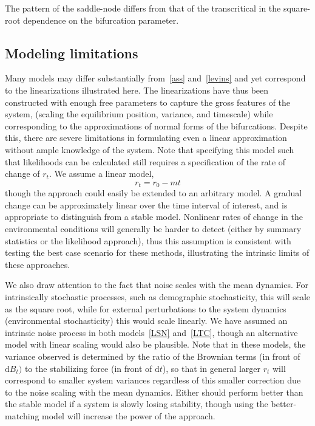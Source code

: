 \documentclass[authoryear, preprint,review,12pt]{elsarticle}
\newcommand{\ud}{\mathrm{d}}
\begin{document}
The pattern of the saddle-node differs from that of the transcritical in the square-root dependence on the bifurcation parameter.


\subsection{Modeling limitations}
Many models may differ substantially from~\eqref{ass} and~\eqref{levins} and yet correspond to the linearizations illustrated here.  
The linearizations have thus been constructed with enough free parameters to capture the gross features of the system,
(scaling the equilibrium position, variance, and timescale) while corresponding to the approximations of normal forms of the bifurcations.  
Despite this, there are severe limitations in formulating even a linear approximation without ample knowledge of the system. 
Note that specifying this model such that likelihoods can be calculated still requires a specification of the rate of change of $r_t$.
We assume a linear model,
\begin{equation}
r_t = r_0 - m t
\label{R_t}
\end{equation}
though the approach could easily be extended to an arbitrary model.
A gradual change can be approximately linear over the time interval of interest, and is appropriate to distinguish from a stable model.
Nonlinear rates of change in the environmental conditions will generally be harder to detect (either by summary statistics or the likelihood approach),
thus this assumption is consistent with testing the best case scenario for these methods, illustrating the intrinsic limits of these approaches.  

We also draw attention to the fact that noise scales with the mean dynamics.  
For intrinsically stochastic processes, such as demographic stochasticity, this will scale as the square root, 
while for external perturbations to the system dynamics (environmental stochasticity) this would scale linearly.
We have assumed an intrinsic noise process in both models~\eqref{LSN} and~\eqref{LTC}, 
though an alternative model with linear scaling would also be plausible.  
Note that in these models, the variance observed is determined by the ratio of the Brownian terms (in front of $\ud B_t)$
to the stabilizing force (in front of $\ud t$), so that in general larger $r_t$ will correspond to smaller system variances
regardless of this smaller correction due to the noise scaling with the mean dynamics.  
Either should perform better than the stable model if a system is slowly losing stability,
though using the better-matching model will increase the power of the approach.  
\end{document}
